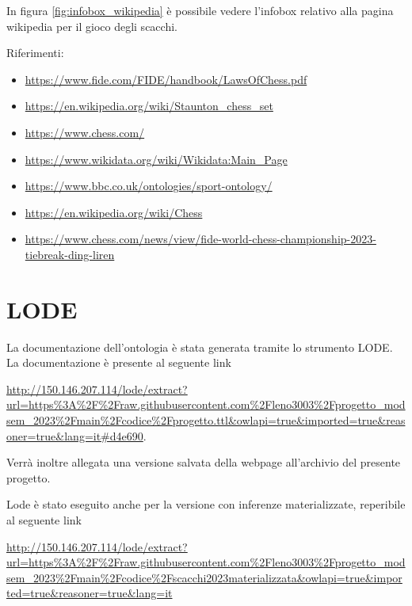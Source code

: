 \documentclass[12pt]{book}
\begin{document}
In figura \ref{fig:infobox_wikipedia} è possibile vedere l'infobox
relativo alla pagina wikipedia per il gioco degli scacchi.

Riferimenti:
\begin{itemize}

  \item \url{https://www.fide.com/FIDE/handbook/LawsOfChess.pdf}
  \item \url{https://en.wikipedia.org/wiki/Staunton_chess_set}
  \item \url{https://www.chess.com/}
  \item \url{https://www.wikidata.org/wiki/Wikidata:Main_Page}
  \item \url{https://www.bbc.co.uk/ontologies/sport-ontology/}
  \item \url{https://en.wikipedia.org/wiki/Chess}
  \item \url{https://www.chess.com/news/view/fide-world-chess-championship-2023-tiebreak-ding-liren}

\end{itemize}


\chapter{LODE}

La documentazione dell'ontologia è stata generata tramite lo strumento
LODE. La documentazione è presente al seguente link 

\begin{tcolorbox}[]

\url{http://150.146.207.114/lode/extract?url=https%3A%2F%2Fraw.githubusercontent.com%2Fleno3003%2Fprogetto_modsem_2023%2Fmain%2Fcodice%2Fprogetto.ttl&owlapi=true&imported=true&reasoner=true&lang=it#d4e690}.

\end{tcolorbox}

Verrà inoltre allegata una versione salvata della webpage
all'archivio del presente progetto.

Lode è stato eseguito anche per la versione con inferenze
materializzate, reperibile al seguente link

\begin{tcolorbox}[title=]
  \url{http://150.146.207.114/lode/extract?url=https%3A%2F%2Fraw.githubusercontent.com%2Fleno3003%2Fprogetto_modsem_2023%2Fmain%2Fcodice%2Fscacchi2023materializzata&owlapi=true&imported=true&reasoner=true&lang=it} 
\end{tcolorbox}
\end{document}
